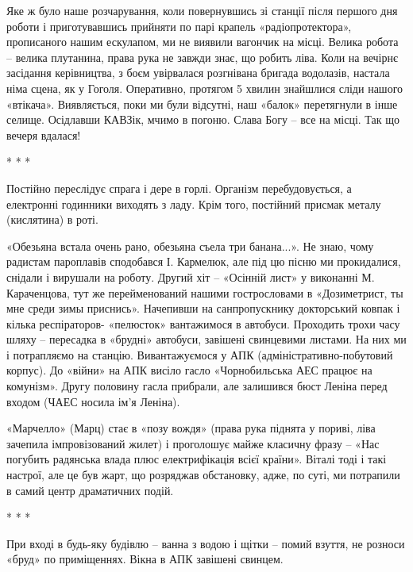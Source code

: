 
Яке ж було наше розчарування, коли повернувшись зі станції після першого дня
роботи і приготувавшись прийняти по парі крапель «радіопротектора», прописаного
нашим ескулапом, ми не виявили вагончик на місці. Велика робота – велика
плутанина, права рука не завжди знає, що робить ліва. Коли на вечірнє засідання
керівництва, з боєм увірвалася розгнівана бригада водолазів, настала німа
сцена, як у Гоголя. Оперативно, протягом 5 хвилин знайшлися сліди нашого
«втікача». Виявляється, поки ми були відсутні, наш «балок» перетягнули в інше
селище. Осідлавши КАВЗік, мчимо в погоню. Слава Богу – все на місці. Так що
вечеря вдалася!

* * *

Постійно переслідує спрага і дере в горлі. Організм перебудовується, а
електронні годинники виходять з ладу. Крім того, постійний присмак металу
(кислятина) в роті.


«Обезьяна встала очень рано, обезьяна съела три банана...». Не знаю, чому
радистам пароплавів сподобався І. Кармелюк, але під цю пісню ми прокидалися,
снідали і вирушали на роботу. Другий хіт – «Осінній лист» у виконанні М.
Караченцова, тут же перейменований нашими гострословами в «Дозиметрист, ты мне
среди зимы приснись». Начепивши на санпропускнику докторський ковпак і кілька
респіраторов- «пелюсток» вантажимося в автобуси. Проходить трохи часу шляху –
пересадка в «брудні» автобуси, завішені свинцевими листами. На них ми і
потрапляємо на станцію. Вивантажуємося у АПК (адміністративно-побутовий
корпус). До «війни» на АПК висіло гасло «Чорнобильська АЕС працює на комунізм».
Другу половину гасла прибрали, але залишився бюст Леніна перед входом (ЧАЕС
носила ім'я Леніна).


«Марчелло» (Марц) стає в «позу вождя» (права рука піднята у пориві, ліва
зачепила імпровізований жилет) і проголошує майже класичну фразу – «Нас
погубить радянська влада плюс електрифікація всієї країни». Віталі тоді і такі
настрої, але це був жарт, що розряджав обстановку, адже, по суті, ми потрапили
в самий центр драматичних подій.

* * *

При вході в будь-яку будівлю – ванна з водою і щітки – помий взуття, не розноси
«бруд» по приміщеннях. Вікна в АПК завішені свинцем.

